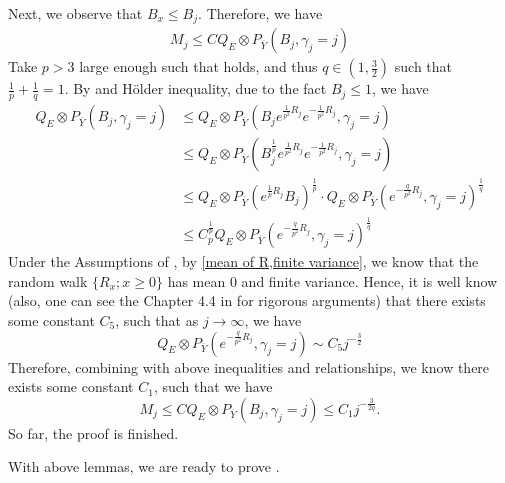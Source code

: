 \documentclass[]{article}
\makeatletter
\numberwithin{equation}{section}
\renewenvironment{proof}[1][\proofname]{%
	\par\pushQED{\qed}\normalfont%
	\topsep6\p@\@plus6\p@\relax
	\trivlist\item[\hskip\labelsep\bfseries#1\@addpunct{.}]%
	\ignorespaces
}{%
	\popQED\endtrivlist\@endpefalse
}
\theoremstyle{thmstyleone}%
\theoremstyle{thmstyletwo}%
\theoremstyle{thmstylethree}%
\theoremstyle{thmstylefour}%
\theoremstyle{thmstylefive}%
\theoremstyle{thmstylesix}%
\makeatother
\begin{document}
\begin{proof}[Proof of \Cref{intermediately lemma}]
		Next, we observe that $B_x\leqslant B_j$. Therefore, we have
		\begin{align*}
			M_j\leqslant
			CQ_E\otimes P_{\overline{Y}}
			\left(B_j,\gamma_j=j\right)
		\end{align*}
		Take $p>3$ large enough such that  holds, and thus $q\in (1,\frac{3}{2})$ such that $\frac{1}{p}+\frac{1}{q} = 1$. 
		By  and H\"older inequality, due to the fact $B_j\leqslant1$, we have
		\begin{align}
			Q_E\otimes P_{\overline{Y}}
			\left(B_j,\gamma_j=j\right)
			&\leqslant
			Q_E\otimes P_{\overline{Y}}
			\left(B_je^{\frac{1}{p^2}R_j} e^{-\frac{1}{p^2}R_j},\gamma_j=j\right)
			\nonumber\\
			&\leqslant
			Q_E\otimes P_{\overline{Y}}
			\left(B_j^{\frac{1}{p}}e^{\frac{1}{p^2}R_j} e^{-\frac{1}{p^2}R_j},\gamma_j=j\right)
			\nonumber\\
			&\leqslant
			Q_E\otimes P_{\overline{Y}}
			\left(
			e^{\frac{1}{p}R_j}B_j\right)^{\frac{1}{p}}
			\cdot Q_E\otimes P_{\overline{Y}}
			\left(
			e^{-\frac{q}{p^2}R_j},\gamma_j=j \right)^{\frac{1}{q}} \nonumber\\
			&\leqslant
			C_p^{\frac{1}{p}} Q_E\otimes P_{\overline{Y}}
			\left(
			e^{-\frac{q}{p^2}R_j},\gamma_j=j \right)^{\frac{1}{q}}
		\end{align}
		Under the Assumptions of , by \cref{mean of R,finite variance}, we know that the random walk $\{R_x;x\geqslant 0\}$ has mean 0 and finite variance. Hence, it is well know (also, one can see the Chapter 4.4 in \cite{B2} for rigorous arguments) that there exists some constant $C_5$, such that as $j\rightarrow\infty$, we have
		\begin{equation*}
			Q_E\otimes P_{\overline{Y}}
			\left(
			e^{-\frac{q}{p^2}R_j},\gamma_j=j	\right) \sim  C_5 j^{-\frac{3}{2}}
		\end{equation*}
		Therefore, combining with above inequalities and relationships, we know there exists some constant $C_1$, such that we have
		\begin{equation*}
			M_j\leqslant CQ_E\otimes P_{\overline{Y}} (B_j,\gamma_j = j)
			\leqslant
			C_1j^{-\frac{3}{2q}}.
		\end{equation*}
		So far, the proof is finished.
	\end{proof}
	
	With above lemmas, we are ready to prove .
	
\end{document}
